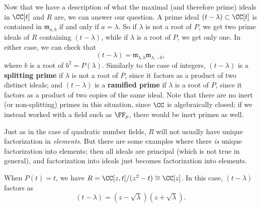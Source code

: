 Now that we have a description of what the maximal (and therefore prime) ideals in $\CC[t]$ and $R$ are, we can answer our question. A prime ideal $(t - \lambda) \subset \CC[t]$ is contained in $\mathfrak{m}_{a, b}$ if and only if $a = \lambda$. So if $\lambda$ is not a root of $P$, we get two prime ideals of $R$ containing $(t - \lambda)$, while if $\lambda$ is a root of $P$, we get only one. In either case, we can check that \[(t - \lambda) = \mathfrak{m}_{\lambda, b}\mathfrak{m}_{\lambda, -b},\] where $b$ is a root of $b^2 = P(\lambda)$. Similarly to the case of integers, $(t - \lambda)$ is a \textbf{splitting prime} if $\lambda$ is not a root of $P$, since it factors as a product of two distinct ideals; and $(t - \lambda)$ is a \textbf{ramified prime} if $\lambda$ is a root of $P$, since it factors as a product of two copies of the same ideal. Note that there are no inert (or non-splitting) primes in this situation, since $\CC$ is algebraically closed; if we instead worked with a field such as $\FF_p$, there would be inert primes as well. 

Just as in the case of quadratic number fields, $R$ will not usually have unique factorization in \emph{elements}. But there are some examples where there \emph{is} unique factorization into elements; then all ideals are principal (which is not true in general), and factorization into ideals just becomes factorization into elements. 

\begin{example}
    When $P(t) = t$, we have $R = \CC[z, t]/(z^2 - t) \cong \CC[z]$. In this case, $(t - \lambda)$ factors as \[(t - \lambda) = (z - \sqrt{\lambda})(z + \sqrt{\lambda}).\] 
\end{example}





